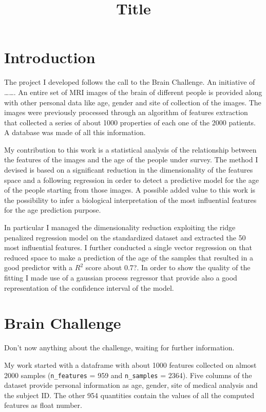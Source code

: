 \documentclass[11pt,a4paper]{report}
\begin{document}
\title{Title}

\section*{Introduction}
The project I developed follows the call to the Brain Challenge. An initiative of \dots \dots.
An entire set of MRI images of the brain of different people is provided along with other personal data like age, gender and site of collection of the images. The images were previously processed through an algorithm of features extraction that collected a series of about 1000 properties of each one of the 2000 patients. A database was made of all this information.

My contribution to this work is a statistical analysis of the relationship between the features of the images and the age of the people under survey. The method I devised is based on a significant reduction in the dimensionality of the features space and a following regression in order to detect a predictive model for the age of the people starting from those images. A possible added value to this work is the possibility to infer a biological interpretation of the most influential features for the age prediction purpose.

In particular I managed the dimensionality reduction exploiting the ridge penalized regression model on the standardized dataset and extracted the 50 most influential features. I further conducted a single vector regression on that reduced space to make a prediction of the age of the samples that resulted in a good predictor with a $R^{2}$ score about 0.7?. In order to show the quality of the fitting I made use of a gaussian process regressor that provide also a good representation of the confidence interval of the model.


\section*{Brain Challenge}
Don't now anything about the challenge, waiting for further information.

My work started with a dataframe with about 1000 features collected on almost 2000 samples  (\texttt{n\_features} = 959 and \texttt{n\_samples} = 2364). Five columns of the dataset provide personal information as age, gender, site of medical analysis and the subject ID. The other 954 quantities contain the values of all the computed features as float number.
\end{document}
